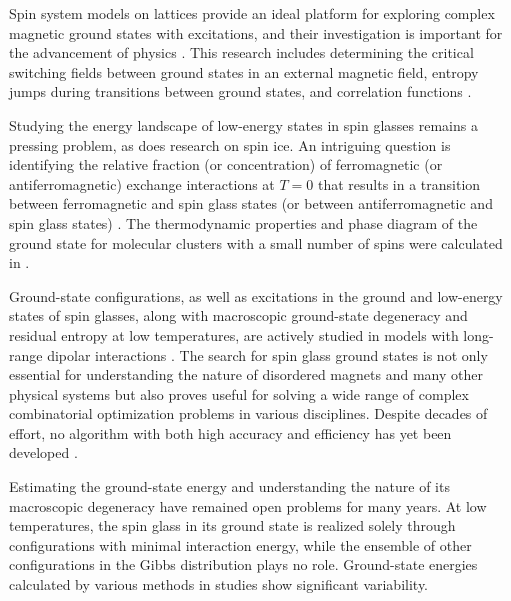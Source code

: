 \documentclass[utf8, babel, sor, jor, amsmath, amssymb, reprint]{elsarticle} %
\begin{document}
Spin system models on lattices provide an ideal platform for exploring complex magnetic ground states with excitations, and their investigation is important for the advancement of physics \cite{lacroix2011introduction}. This research includes determining the critical switching fields between ground states in an external magnetic field, entropy jumps during transitions between ground states, and correlation functions \cite{ramirez2004effect, rosas2004random, andriushchenko2019large}.  

Studying the energy landscape of low-energy states in spin glasses \cite{biswas2023energy} remains a pressing problem, as does research on spin ice. An intriguing question is identifying the relative fraction (or concentration) of ferromagnetic (or antiferromagnetic) exchange interactions at $T=0$ that results in a transition between ferromagnetic and spin glass states (or between antiferromagnetic and spin glass states) \cite{gruzberg2001random, honecker2001universality, picco2006strong, tsomokos2011interplay, zimmer2022role}. The thermodynamic properties and phase diagram of the ground state for molecular clusters with a small number of spins were calculated in \cite{dias2023ground}.

Ground-state configurations, as well as excitations in the ground and low-energy states of spin glasses, along with macroscopic ground-state degeneracy and residual entropy at low temperatures, are actively studied in models with long-range dipolar interactions \cite{makarova2021low, singh2024micromagnetic}. The search for spin glass ground states is not only essential for understanding the nature of disordered magnets and many other physical systems but also proves useful for solving a wide range of complex combinatorial optimization problems in various disciplines. Despite decades of effort, no algorithm with both high accuracy and efficiency has yet been developed \cite{fan2023searching}.  

Estimating the ground-state energy and understanding the nature of its macroscopic degeneracy have remained open problems for many years. At low temperatures, the spin glass in its ground state is realized solely through configurations with minimal interaction energy, while the ensemble of other configurations in the Gibbs distribution plays no role. Ground-state energies calculated by various methods in studies \cite{thouless1977solution, sherrington1975solvable, tanaka1980analytic, klein1976comparison, kirkpatrick1978infinite, karandashev2019global, palmer1999ground, campbell2004energy, roma2009ground} show significant variability.  
\end{document}
